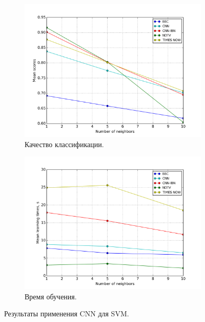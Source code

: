 \begin{figure}[h!]
	\centering
	\begin{subfigure}{0.45\textwidth}
		\includegraphics[width=\textwidth]{images/cnn-SVM.png}
		\caption{Качество классификации.}
	\end{subfigure}
	\begin{subfigure}{0.45\textwidth}
		\includegraphics[width=\textwidth]{images/cnn-SVMTime.png}
		\caption{Время обучения.}
	\end{subfigure}
	\caption{Результаты применения CNN для SVM.}\label{fig:cnn-svm-results}
\end{figure}

